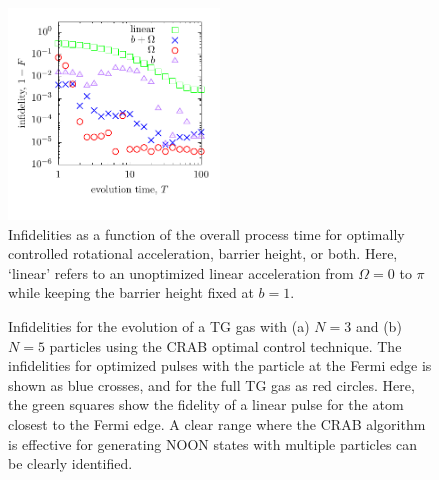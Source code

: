 \begin{figure}
 \centering \includegraphics[width=0.5\textwidth]{data/1d/figlfid.pdf}
\caption{ Infidelities as a function of the overall process time for optimally controlled rotational acceleration, barrier height, or both.
Here, `linear' refers to an unoptimized linear acceleration from $\Omega = 0$ to $\pi$ while keeping the barrier height fixed at $b=1$.
}
\label{fig:lfid}
\end{figure}

\begin{figure}[t]
 \centering
 \caption{
Infidelities for the evolution of a TG gas with (a) $N=3$ and (b) $N=5$ particles using the CRAB optimal control technique.
The infidelities for optimized pulses with the particle at the Fermi edge is shown as blue crosses, and for the full TG gas as red circles.
Here, the green squares show the fidelity of a linear pulse for the atom closest to the Fermi edge.
A clear range where the CRAB algorithm is effective for generating NOON states with multiple particles can be clearly identified.}
 \label{fig:TGOC}
\end{figure} 


